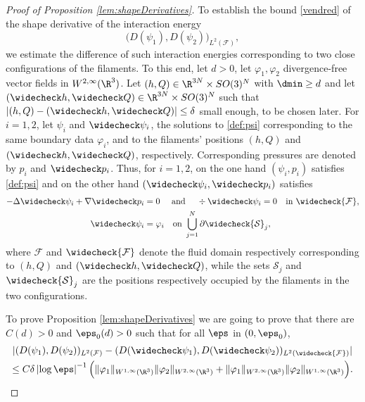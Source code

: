 \begin{proof}[Proof of Proposition \ref{lem:shapeDerivatives}]
To establish the bound \eqref{vendred} of the shape derivative of the interaction energy
\[
\big(D (\psi_1),D (\psi_2)\big)_{L^2(\mathcal F)},\] we estimate the difference of such interaction energies
corresponding to two close configurations of the filaments.
To this end, let $d>0$, let $\varphi_1,\varphi_2 $ divergence-free vector fields in $W^{2,\infty}(\R^3)$. Let $(h,Q) \in \R^{3N} \times SO(3)^N$ with $\dmin \geq d$
and let $(\widecheck h,\widecheck Q) \in \R^{3N} \times SO(3)^N$ such that $|(h, Q) - (\widecheck h,\widecheck Q)| \leq \delta$ small enough, to be chosen later.
For $i = 1,2$, let $\psi_i$ and $ \widecheck \psi_i$, the solutions to \eqref{def:psi} corresponding to the same boundary data $\varphi_i$, and to the filaments' positions $(h, Q)$ and $(\widecheck h,\widecheck Q)$, respectively. Corresponding pressures are denoted by $p_i$ and $\widecheck p_i$.
Thus, for $i = 1,2$, on the one hand $(\psi_i,p_i)$ satisfies \eqref{def:psi}
and on the other hand $(\widecheck \psi_i,\widecheck p_i)$ satisfies
\begin{equation} \label{def:psi-bar}
\begin{aligned}
- \Delta \widecheck \psi_i + \nabla \widecheck p_i &= 0 \quad \text{ and } \quad \div \widecheck \psi_i = 0 \quad \text{in } \widecheck {\mathcal F}, \\
\widecheck \psi_i &= \varphi_i \quad \text{on } \bigcup_{j=1}^N \partial \widecheck {\mathcal S}_j,
\end{aligned}
\end{equation}
where $\mathcal F$ and $\widecheck {\mathcal F}$ denote the fluid domain respectively corresponding to $(h, Q)$ and $(\widecheck h, \widecheck Q)$, while the sets ${\mathcal S}_j$ and $\widecheck {\mathcal S}_j$ are the positions respectively occupied by the filaments in the two configurations.

To prove Proposition \ref{lem:shapeDerivatives}
we are going to prove that there are $C(d)>0$ and $\eps_0(d) >0$ such that for all $\eps$ in $(0, \eps_0)$,
\begin{multline} \label{est:psi_1.psi_2}
|(D(\psi_1),D(\psi_2))_{L^2(\mathcal F)} - (D(\widecheck \psi_1),D(\widecheck \psi_2))_{L^2(\widecheck{\mathcal F})}|
\\ \leq C\delta \left|\log \eps\right|^{-1}
\Bigl(\|\varphi_1\|_{W^{1,\infty} (\R^3) } \|\varphi_2\|_{W^{2,\infty} (\R^3)}
+
\|\varphi_1\|_{W^{2,\infty} (\R^3) } \|\varphi_2\|_{W^{1,\infty} (\R^3)}
\Bigr).
\end{multline}


\end{proof}
